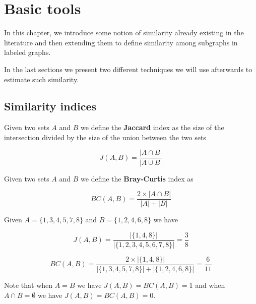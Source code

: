 
\chapter{Basic tools}

In this chapter, we introduce some notion of similarity already existing in the literature and then extending them to define similarity among subgraphs in labeled graphs.

In the last sections we present two different techniques we will use afterwards to estimate such similarity.

\section{Similarity indices}

\begin{definizione}\label{def:jaccard}
	Given two sets $A$ and $B$ we define the \textbf{Jaccard} index as the size of the intersection divided by the size of the union between the two sets
	
	\begin{equation}
	J(A,B) = \frac{|A \cap B|}{|A \cup B|}
	\end{equation}
	
\end{definizione}

\begin{definizione}\label{def:bray}
	Given two sets $A$ and $B$ we define the \textbf{Bray-Curtis} index as
	
	\begin{equation}
	BC(A,B) = \frac{2 \times |A \cap B|}{|A| + |B|}
	\end{equation}
	
\end{definizione}

\begin{esempio}
	Given $A = \{1, 3, 4, 5, 7, 8\}$ and $B = \{1, 2, 4, 6, 8\}$ we have
	
	\begin{equation*}
	J(A,B) = \frac{|\{1, 4, 8\}|}{|\{1, 2, 3, 4, 5, 6, 7, 8\}|} = \frac{3}{8} 
	\end{equation*}
	
	\begin{equation*}
	BC(A,B) = \frac{2 \times |\{1, 4, 8\}|}{|\{1, 3, 4, 5, 7, 8\}| + |\{1, 2, 4, 6, 8\}|} = \frac{6}{11} 
	\end{equation*}
\end{esempio}

Note that when $A = B$ we have $J(A, B) = BC(A, B) = 1$ and when $A \cap B = \emptyset$ we have $J (A, B) = BC (A, B) = 0$.

